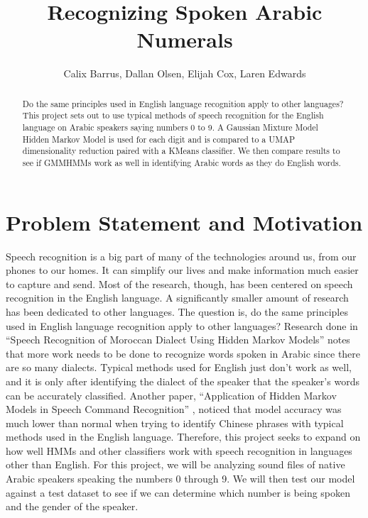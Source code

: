 \documentclass[11pt]{article}
\newcommand{\0}{{\vec  0 }}
\newcommand{\1}{{\mathbbm{  1} }}
\begin{document}
    
    \title{Recognizing Spoken Arabic Numerals}
    \author{Calix Barrus, Dallan Olsen, Elijah Cox, Laren Edwards}
    
    \maketitle
    
    \begin{abstract}
        Do the same principles used in English language recognition apply to other languages? This project sets out to use typical methods of speech recognition for the English language on Arabic speakers saying numbers 0 to 9. A Gaussian Mixture Model Hidden Markov Model is used for each digit and is compared to a UMAP dimensionality reduction paired with a KMeans classifier. We then compare results to see if GMMHMMs work as well in identifying Arabic words as they do English words.
    \end{abstract}
    
    \section{Problem Statement and Motivation}
    Speech recognition is a big part of many of the technologies around us, from our phones to our homes. It can simplify our lives and make information much easier to capture and send. Most of the research, though, has been centered on speech recognition in the English language. A significantly smaller amount of research has been dedicated to other languages. The question is, do the same principles used in English language recognition apply to other languages? Research done in “Speech Recognition of Moroccan Dialect Using Hidden Markov Models” \cite{RefWorks:RefID:42-mouaz2019speech} notes that more work needs to be done to recognize words spoken in Arabic since there are so many dialects. Typical methods used for English just don’t work as well, and it is only after identifying the dialect of the speaker that the speaker’s words can be accurately classified. Another paper, “Application of Hidden Markov Models in Speech Command Recognition” \cite{RefWorks:RefID:41-2020application}, noticed that model accuracy was much lower than normal when trying to identify Chinese phrases with typical methods used in the English language. Therefore, this project seeks to expand on how well HMMs and other classifiers work with speech recognition in languages other than English. For this project, we will be analyzing sound files of native Arabic speakers speaking the numbers 0 through 9. We will then test our model against a test dataset to see if we can determine which number is being spoken and the gender of the speaker. 
    
\end{document}
